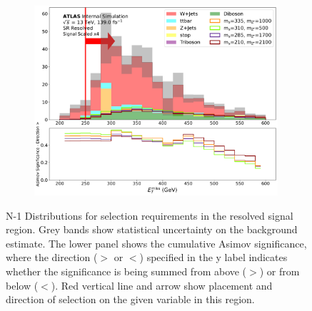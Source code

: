 \begin{figure}[htbp]
\begin{subfigure}[t]{0.48\textwidth}
     \includegraphics[width = 0.99\textwidth]{Figures/5/SR1L_Resolved/MetTST_met_N_1.pdf}
    \caption{\met}
    \end{subfigure}
     \caption{N-1 Distributions for selection requirements in the resolved signal region. Grey bands show statistical uncertainty on the background estimate. The lower panel shows the cumulative Asimov significance, where the direction (\(>\) or \(<\)) specified in the y label indicates whether the significance is being summed from above (\(>\)) or from below (\(<\)). Red vertical line and arrow show placement and direction of selection on the given variable in this region.}
     \label{fig:Nminus1resolvedSR}
\end{figure}
